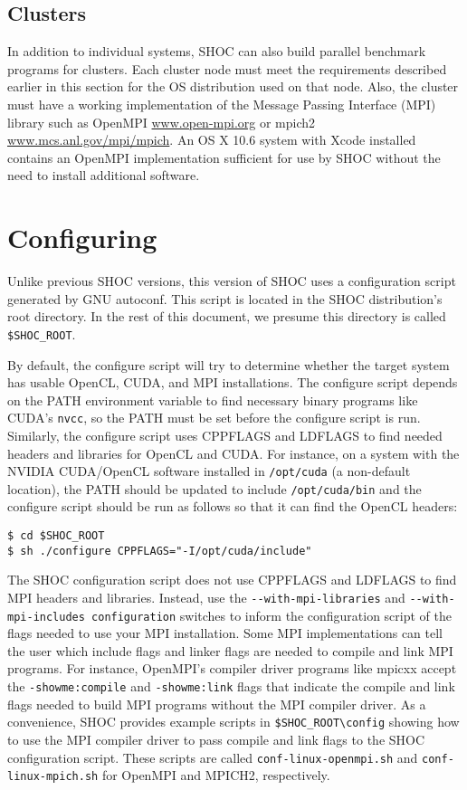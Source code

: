 \documentclass[11pt]{article}
\begin{document}
\subsection{Clusters}
In addition to individual systems, SHOC can also build parallel benchmark
programs for clusters. Each cluster node must meet the requirements described
earlier in this section for the OS distribution used on that node.
Also, the cluster must have a working implementation of the 
Message Passing Interface 
(MPI)\,\cite{gropp-lusk-skjellum:using-mpi2nd,gropp-lusk-thakur:usingmpi2}
library such as OpenMPI \url{www.open-mpi.org} or mpich2 
\url{www.mcs.anl.gov/mpi/mpich}.
An OS X 10.6 system with Xcode installed contains an OpenMPI implementation
sufficient for use by SHOC without the need to install additional software.


\section{Configuring}\label{sec:configuring}

Unlike previous SHOC versions, this version of SHOC uses a configuration script
generated by GNU autoconf.  
This script is located in the SHOC distribution's root directory.
In the rest of this document, we presume this directory is called 
\verb+$SHOC_ROOT+.

By default, the configure script will try to determine whether the 
target system has usable OpenCL, CUDA, and MPI installations.  
The configure script depends on the PATH environment variable to find necessary
binary programs like CUDA's \verb+nvcc+, so the PATH must be set before the
configure script is run.
Similarly, the configure script uses CPPFLAGS and LDFLAGS to find needed
headers and libraries for OpenCL and CUDA.
For instance, on a system with the NVIDIA CUDA/OpenCL software installed
in \verb+/opt/cuda+ (a non-default location), the PATH should be updated to include
\verb+/opt/cuda/bin+ and the configure script should be run as follows so that it can
find the OpenCL headers:

\begin{Verbatim}[frame=single]
$ cd $SHOC_ROOT
$ sh ./configure CPPFLAGS="-I/opt/cuda/include"
\end{Verbatim}

The SHOC configuration script does not use CPPFLAGS and LDFLAGS to find 
MPI headers and libraries.
Instead, use the \verb+--with-mpi-libraries+ and \verb+--with-mpi-includes configuration+
switches to inform the configuration script of the flags needed to use
your MPI installation.
Some MPI implementations can tell the user which include flags and linker
flags are needed to compile and link MPI programs.
For instance, OpenMPI's compiler driver programs like mpicxx accept the
\verb+-showme:compile+ and \verb+-showme:link+ flags that indicate the compile and 
link flags needed to build MPI programs without the MPI compiler driver.
As a convenience, SHOC provides example scripts in \verb+$SHOC_ROOT\config+ 
showing how to use the MPI compiler driver to pass compile and link flags
to the SHOC configuration script.
These scripts are called \verb+conf-linux-openmpi.sh+ and 
\verb+conf-linux-mpich.sh+ for 
OpenMPI and MPICH2, respectively.
\end{document}
